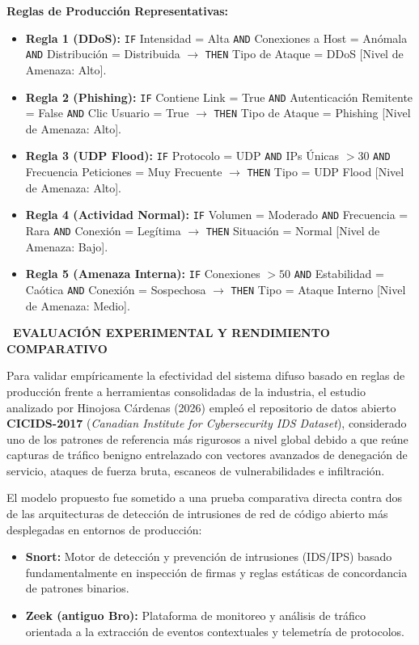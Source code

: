 \documentclass[12pt,a4paper]{article}
\newcommand{\llav}{\symbol{60}\symbol{60}}
\newcommand{\rlav}{\symbol{62}\symbol{62}}
\newcommand{\marcador}[1]{\llav\ #1\ \rlav}
\newcommand{\seccion}[1]{%
  \vspace{0.65cm}%
  {\centering\bfseries\fontsize{12pt}{14pt}\selectfont\marcador{\MakeUppercase{#1}}\par}%
  \vspace{0.30cm}%
}
\begin{document}
\textbf{Reglas de Producción Representativas:}
\begin{itemize}
    \item \textbf{Regla 1 (DDoS):} \texttt{IF} Intensidad = Alta \texttt{AND} Conexiones a Host = Anómala \texttt{AND} Distribución = Distribuida $\longrightarrow$ \texttt{THEN} Tipo de Ataque = DDoS [Nivel de Amenaza: Alto].
    \item \textbf{Regla 2 (Phishing):} \texttt{IF} Contiene Link = True \texttt{AND} Autenticación Remitente = False \texttt{AND} Clic Usuario = True $\longrightarrow$ \texttt{THEN} Tipo de Ataque = Phishing [Nivel de Amenaza: Alto].
    \item \textbf{Regla 3 (UDP Flood):} \texttt{IF} Protocolo = UDP \texttt{AND} IPs Únicas $> 30$ \texttt{AND} Frecuencia Peticiones = Muy Frecuente $\longrightarrow$ \texttt{THEN} Tipo = UDP Flood [Nivel de Amenaza: Alto].
    \item \textbf{Regla 4 (Actividad Normal):} \texttt{IF} Volumen = Moderado \texttt{AND} Frecuencia = Rara \texttt{AND} Conexión = Legítima $\longrightarrow$ \texttt{THEN} Situación = Normal [Nivel de Amenaza: Bajo].
    \item \textbf{Regla 5 (Amenaza Interna):} \texttt{IF} Conexiones $> 50$ \texttt{AND} Estabilidad = Caótica \texttt{AND} Conexión = Sospechosa $\longrightarrow$ \texttt{THEN} Tipo = Ataque Interno [Nivel de Amenaza: Medio].
\end{itemize}

\seccion{EVALUACIÓN EXPERIMENTAL Y RENDIMIENTO COMPARATIVO}

Para validar empíricamente la efectividad del sistema difuso basado en reglas de producción frente a herramientas consolidadas de la industria, el estudio analizado por Hinojosa Cárdenas (2026) empleó el repositorio de datos abierto \textbf{CICIDS-2017} (\textit{Canadian Institute for Cybersecurity IDS Dataset}), considerado uno de los patrones de referencia más rigurosos a nivel global debido a que reúne capturas de tráfico benigno entrelazado con vectores avanzados de denegación de servicio, ataques de fuerza bruta, escaneos de vulnerabilidades e infiltración.

El modelo propuesto fue sometido a una prueba comparativa directa contra dos de las arquitecturas de detección de intrusiones de red de código abierto más desplegadas en entornos de producción:
\begin{itemize}
    \item \textbf{Snort:} Motor de detección y prevención de intrusiones (IDS/IPS) basado fundamentalmente en inspección de firmas y reglas estáticas de concordancia de patrones binarios.
    \item \textbf{Zeek (antiguo Bro):} Plataforma de monitoreo y análisis de tráfico orientada a la extracción de eventos contextuales y telemetría de protocolos.
\end{itemize}
\end{document}
